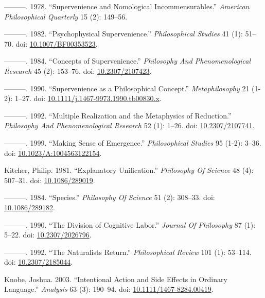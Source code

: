 \documentclass[
  10pt,
  letterpaper,
  DIV=11,
  numbers=noendperiod,
  twoside]{scrartcl}
\newlength{\cslhangindent}
\newenvironment{CSLReferences}[2] %
 {\begin{list}{}{%
  \setlength{\itemindent}{0pt}
  \setlength{\leftmargin}{0pt}
  \setlength{\parsep}{0pt}
  \ifodd #1
   \setlength{\leftmargin}{\cslhangindent}
   \setlength{\itemindent}{-1\cslhangindent}
  \fi
  \setlength{\itemsep}{#2\baselineskip}}}
 {\end{list}}
\begin{document}
\begin{CSLReferences}{1}{0}
---------. 1978. {``Supervenience and Nomological Incommensurables.''}
\emph{American Philosophical Quarterly} 15 (2): 149--56.

---------. 1982. {``Psychophysical Supervenience.''} \emph{Philosophical
Studies} 41 (1): 51--70. doi:
\href{https://doi.org/10.1007/BF00353523}{10.1007/BF00353523}.

---------. 1984. {``Concepts of Supervenience.''} \emph{Philosophy And
Phenomenological Research} 45 (2): 153--76. doi:
\href{https://doi.org/10.2307/2107423}{10.2307/2107423}.

---------. 1990. {``Supervenience as a Philosophical Concept.''}
\emph{Metaphilosophy} 21 (1-2): 1--27. doi:
\href{https://doi.org/10.1111/j.1467-9973.1990.tb00830.x}{10.1111/j.1467-9973.1990.tb00830.x}.

---------. 1992. {``Multiple Realization and the Metaphysics of
Reduction.''} \emph{Philosophy And Phenomenological Research} 52 (1):
1--26. doi: \href{https://doi.org/10.2307/2107741}{10.2307/2107741}.

---------. 1999. {``Making Sense of Emergence.''} \emph{Philosophical
Studies} 95 (1-2): 3--36. doi:
\href{https://doi.org/10.1023/A:1004563122154}{10.1023/A:1004563122154}.

Kitcher, Philip. 1981. {``Explanatory Unification.''} \emph{Philosophy
Of Science} 48 (4): 507--31. doi:
\href{https://doi.org/10.1086/289019}{10.1086/289019}.

---------. 1984. {``Species.''} \emph{Philosophy Of Science} 51 (2):
308--33. doi: \href{https://doi.org/10.1086/289182}{10.1086/289182}.

---------. 1990. {``The Division of Cognitive Labor.''} \emph{Journal Of
Philosophy} 87 (1): 5--22. doi:
\href{https://doi.org/10.2307/2026796}{10.2307/2026796}.

---------. 1992. {``The Naturalists Return.''} \emph{Philosophical
Review} 101 (1): 53--114. doi:
\href{https://doi.org/10.2307/2185044}{10.2307/2185044}.

Knobe, Joshua. 2003. {``Intentional Action and Side Effects in Ordinary
Language.''} \emph{Analysis} 63 (3): 190--94. doi:
\href{https://doi.org/10.1111/1467-8284.00419}{10.1111/1467-8284.00419}.


\end{CSLReferences}
\end{document}
